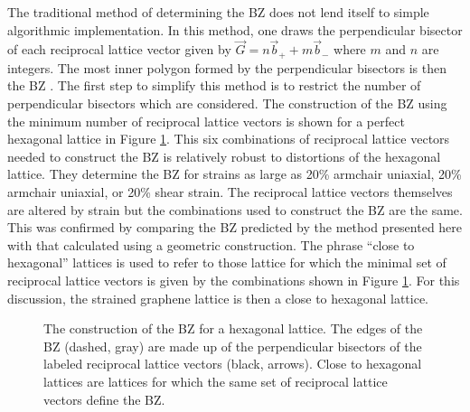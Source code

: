 The traditional method of determining the BZ does not lend itself to simple algorithmic implementation.
In this method, one draws the perpendicular bisector of each reciprocal lattice vector given by $\vec{G}=n \vec{b}_+ + m \vec{b}_-$ where $m$ and $n$ are integers.
The most inner polygon formed by the perpendicular bisectors is then the BZ \cite{Kittel2005}.
The first step to simplify this method is to restrict the number of perpendicular bisectors which are considered.
The construction of the BZ using the minimum number of reciprocal lattice vectors is shown for a perfect hexagonal lattice in Figure \ref{fig:sBZ:BZ}.
This six combinations of reciprocal lattice vectors needed to construct the BZ is relatively robust to distortions of the hexagonal lattice.
They determine the BZ for strains as large as 20\% armchair uniaxial, 20\% armchair uniaxial, or 20\% shear strain.
The reciprocal lattice vectors themselves are altered by strain but the combinations used to construct the BZ are the same.
This was confirmed by comparing the BZ predicted by the method presented here with that calculated using a geometric construction.
The phrase ``close to hexagonal'' lattices is used to refer to those lattice for which the minimal set of reciprocal lattice vectors is given by the combinations shown in Figure \ref{fig:sBZ:BZ}.
For this discussion, the strained graphene lattice is then a close to hexagonal lattice.

\begin{figure}
	\begin{center}
	
	\end{center}
	\caption[The construction of the BZ for a hexagonal lattice]{\label{fig:sBZ:BZ}
	The construction of the BZ for a hexagonal lattice.
	The edges of the BZ (dashed, gray) are made up of the perpendicular bisectors of the labeled reciprocal lattice vectors (black, arrows).
	Close to hexagonal lattices are lattices for which the same set of reciprocal lattice vectors define the BZ.}
\end{figure}

